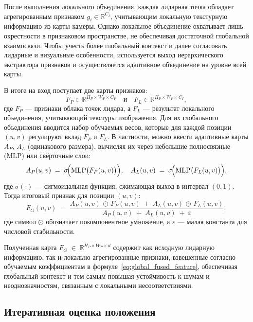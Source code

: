 После выполнения локального объединения, каждая лидарная точка обладает агрегированным признаком 
${g}_i \in \mathbb{R}^{C_I}$, учитывающим локальную текстурную информацию из карты камеры. 
Однако локальное объединение охватывает лишь окрестности в признаковом пространстве, 
не обеспечивая достаточной глобальной взаимосвязи. 
Чтобы учесть более глобальный контекст и далее согласовать лидарные и визуальные особенности, 
используется выход иерархического экстрактора признаков и осуществляется адаптивное объединение на уровне всей карты.

В итоге на вход поступает две карты признаков: 
\[
  {F}_P\in\mathbb{R}^{H_P\times W_P\times C_P}
  \quad\text{и}\quad
  {F}_L\in\mathbb{R}^{H_P\times W_P\times C_I},
\]
где ${F}_P$ --- признаки облака точек лидара, 
а ${F}_L$ --- результат локального объединения, учитывающий текстуры изображения. 
Для их глобального объединения вводится набор обучаемых весов, 
которые для каждой позиции $(u,v)$ регулируют вклад ${F}_P$ и ${F}_L$. 
В частности, можно ввести адаптивные карты ${A}_P,\,{A}_L$ (одинакового размера), вычисляя их через небольшие полносвязные (MLP) или свёрточные слои:
\begin{equation*}
\label{eq:global_adaptive_weights}
  {A}_P(u,v) \;=\; \sigma\!\Bigl(\mathrm{MLP}\bigl({F}_P(u,v)\bigr)\Bigr), 
  \quad
  {A}_L(u,v) \;=\; \sigma\!\Bigl(\mathrm{MLP}\bigl({F}_L(u,v)\bigr)\Bigr),
\end{equation*}
где $\sigma(\cdot)$ --- сигмоидальная функция, сжимающая выход в интервал $(0,1)$. 
Тогда итоговый признак для позиции $(u,v)$:
\begin{equation}
\label{eq:global_fused_feature}
  {F}_G(u,v)
  \;=\; 
  \frac{
    {A}_P(u,v)\,\odot\,{F}_P(u,v)
    \;+\;
    {A}_L(u,v)\,\odot\,{F}_L(u,v)
  }{
    {A}_P(u,v) \;+\;{A}_L(u,v)\;+\;\varepsilon
  },
\end{equation}
где символ $\odot$ обозначает покомпонентное умножение, 
а $\varepsilon$ --- малая константа для числовой стабильности.

Полученная карта
\(
  {F}_G 
  \;\in\; 
  \mathbb{R}^{H_P\times W_P\times d}
\)
содержит как исходную лидарную информацию, 
так и локально-агрегированные признаки, 
взвешенные согласно обучаемым коэффициентам в формуле~\eqref{eq:global_fused_feature},
обеспечивая глобальный контекст и тем самым повышая устойчивость к шумам и неоднозначностям, 
связанным с локальными несоответствиями.

\subsection{Итеративная оценка положения}
\label{sec:iter_pose_est}

